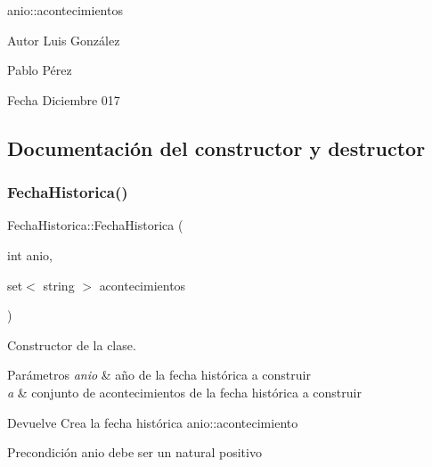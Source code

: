 anio\+::acontecimientos

\begin{DoxyAuthor}{Autor}
Luis González 

Pablo Pérez 
\end{DoxyAuthor}
\begin{DoxyDate}{Fecha}
Diciembre 017 
\end{DoxyDate}


\subsection{Documentación del constructor y destructor}
\mbox{\label{classFechaHistorica_a45055b37912e7ff4c9cafb4240c45bce}} 
\subsubsection{\texorpdfstring{Fecha\+Historica()}{FechaHistorica()}\hspace{0.1cm}{\footnotesize\ttfamily [1/2]}}
{\footnotesize\ttfamily Fecha\+Historica\+::\+Fecha\+Historica (\begin{DoxyParamCaption}\item[{int}]{anio,  }\item[{set$<$ string $>$}]{acontecimientos }\end{DoxyParamCaption})}



Constructor de la clase. 


\begin{DoxyParams}{Parámetros}
{\em anio} & año de la fecha histórica a construir \\
\hline
{\em a} & conjunto de acontecimientos de la fecha histórica a construir \\
\hline
\end{DoxyParams}
\begin{DoxyReturn}{Devuelve}
Crea la fecha histórica anio\+::acontecimiento 
\end{DoxyReturn}
\begin{DoxyPrecond}{Precondición}
anio debe ser un natural positivo 
\end{DoxyPrecond}
\mbox{\label{classFechaHistorica_a40a9c133a139d41bf84406e09022feaf}} 
